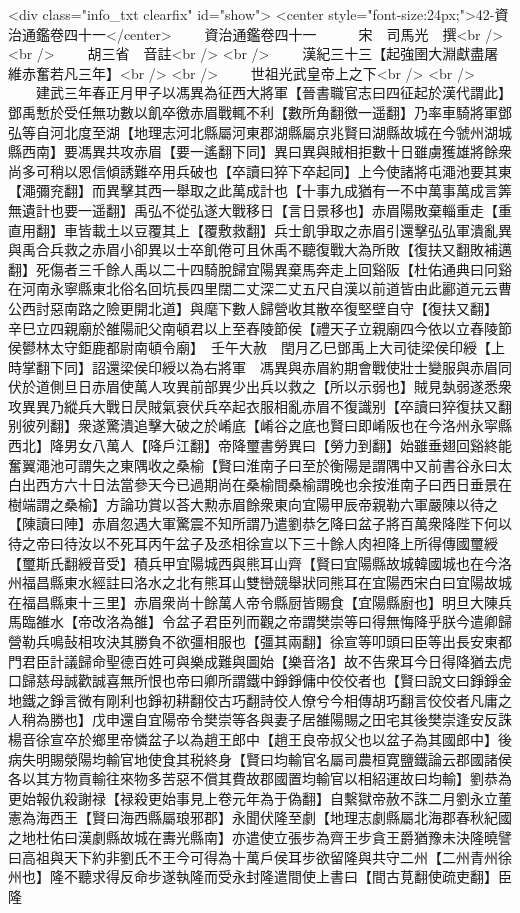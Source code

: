 <div class="info_txt clearfix" id="show">
<center style="font-size:24px;">42-資治通鑑卷四十一</center>
  　　資治通鑑卷四十一　　　宋　司馬光　撰<br />
<br />
　　胡三省　音註<br />
<br />
　　漢紀三十三【起強圉大淵獻盡屠維赤奮若凡三年】<br />
<br />
　　世祖光武皇帝上之下<br />
<br />
　　建武三年春正月甲子以馮異為征西大將軍【晉書職官志曰四征起於漢代謂此】鄧禹慙於受任無功數以飢卒徼赤眉戰輒不利【數所角翻徼一遥翻】乃率車騎將軍鄧弘等自河北度至湖【地理志河北縣屬河東郡湖縣屬京兆賢曰湖縣故城在今虢州湖城縣西南】要馮異共攻赤眉【要一遙翻下同】異曰異與賊相拒數十日雖虜獲雄將餘衆尚多可稍以恩信傾誘難卒用兵破也【卒讀曰猝下卒起同】上今使諸將屯澠池要其東【澠彌兖翻】而異擊其西一舉取之此萬成計也【十事九成猶有一不中萬事萬成言筭無遺計也要一遥翻】禹弘不從弘遂大戰移日【言日景移也】赤眉陽敗棄輜重走【重直用翻】車皆載土以豆覆其上【覆敷救翻】兵士飢爭取之赤眉引還擊弘弘軍潰亂異與禹合兵救之赤眉小卻異以士卒飢倦可且休禹不聽復戰大為所敗【復扶又翻敗補邁翻】死傷者三千餘人禹以二十四騎脫歸宜陽異棄馬奔走上回谿阪【杜佑通典曰冋谿在河南永寧縣東北俗名回坑長四里闊二丈深二丈五尺自漢以前道皆由此酈道元云曹公西討惡南路之險更開北道】與麾下數人歸營收其散卒復堅壁自守【復扶又翻】　辛巳立四親廟於雒陽祀父南頓君以上至舂陵節侯【禮天子立親廟四今依以立舂陵節侯鬰林太守鉅鹿都尉南頓令廟】　壬午大赦　閏月乙巳鄧禹上大司徒梁侯印綬【上時掌翻下同】詔還梁侯印綬以為右將軍　馮異與赤眉約期會戰使壯士變服與赤眉同伏於道側旦日赤眉使萬人攻異前部異少出兵以救之【所以示弱也】賊見埶弱遂悉衆攻異異乃縱兵大戰日昃賊氣衰伏兵卒起衣服相亂赤眉不復識别【卒讀曰猝復扶又翻别彼列翻】衆遂驚潰追擊大破之於崤底【崤谷之底也賢曰即崤阪也在今洛州永寜縣西北】降男女八萬人【降戶江翻】帝降璽書勞異曰【勞力到翻】始雖垂翅回谿終能奮翼澠池可謂失之東隅收之桑榆【賢曰淮南子曰至於衡陽是謂隅中又前書谷永曰太白出西方六十日法當參天今已過期尚在桑榆間桑榆謂晚也余按淮南子曰西日垂景在樹端謂之桑榆】方論功賞以荅大勲赤眉餘衆東向宜陽甲辰帝親勒六軍嚴陳以待之【陳讀曰陣】赤眉忽遇大軍驚震不知所謂乃遣劉恭乞降曰盆子將百萬衆降陛下何以待之帝曰待汝以不死耳丙午盆子及丞相徐宣以下三十餘人肉袒降上所得傳國璽綬【璽斯氏翻綬音受】積兵甲宜陽城西與熊耳山齊【賢曰宜陽縣故城韓國城也在今洛州福昌縣東水經註曰洛水之北有熊耳山雙巒競舉狀同熊耳在宜陽西宋白曰宜陽故城在福昌縣東十三里】赤眉衆尚十餘萬人帝令縣厨皆賜食【宜陽縣廚也】明旦大陳兵馬臨雒水【帝改洛為雒】令盆子君臣列而觀之帝謂樊崇等曰得無悔降乎朕今遣卿歸營勒兵鳴鼔相攻決其勝負不欲彊相服也【彊其兩翻】徐宣等叩頭曰臣等出長安東都門君臣計議歸命聖德百姓可與樂成難與圖始【樂音洛】故不告衆耳今日得降猶去虎口歸慈母誠歡誠喜無所恨也帝曰卿所謂鐵中錚錚傭中佼佼者也【賢曰說文曰錚錚金地鐵之錚言微有剛利也錚初耕翻佼古巧翻詩佼人僚兮今相傳胡巧翻言佼佼者凡庸之人稍為勝也】戊申還自宜陽帝令樊崇等各與妻子居雒陽賜之田宅其後樊崇逢安反誅楊音徐宣卒於鄉里帝憐盆子以為趙王郎中【趙王良帝叔父也以盆子為其國郎中】後病失明賜滎陽均輸官地使食其税終身【賢曰均輸官名屬司農桓寛鹽鐵論云郡國諸侯各以其方物貢輸往來物多苦惡不償其費故郡國置均輸官以相紹運故曰均輸】劉恭為更始報仇殺謝禄【禄殺更始事見上卷元年為于偽翻】自繫獄帝赦不誅二月劉永立董憲為海西王【賢曰海西縣屬琅邪郡】永聞伏隆至劇【地理志劇縣屬北海郡春秋紀國之地杜佑曰漢劇縣故城在夀光縣南】亦遣使立張步為齊王步貪王爵猶豫未決隆曉譬曰高祖與天下約非劉氏不王今可得為十萬戶侯耳步欲留隆與共守二州【二州青州徐州也】隆不聽求得反命步遂執隆而受永封隆遣間使上書曰【間古莧翻使疏吏翻】臣隆